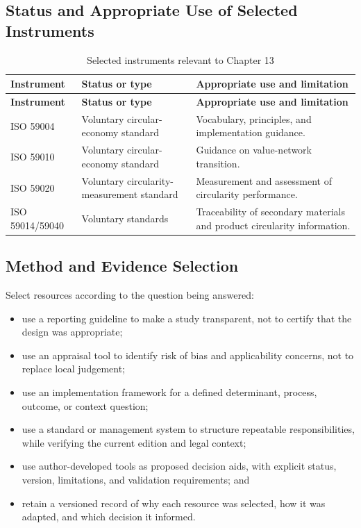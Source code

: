 \subsection{Status and Appropriate Use of Selected Instruments}
\begin{longtable}{@{}p{}p{}p{}@{}}
\caption{Selected instruments relevant to Chapter 13}
\label{tab:comp-ch13-instrument-status}\\
\toprule
\textbf{Instrument} & \textbf{Status or type} & \textbf{Appropriate use and limitation} \\
\midrule
\endfirsthead
\toprule
\textbf{Instrument} & \textbf{Status or type} & \textbf{Appropriate use and limitation} \\
\midrule
\endhead
\bottomrule
\endlastfoot
ISO 59004 & Voluntary circular-economy standard & Vocabulary, principles, and implementation guidance. \\
ISO 59010 & Voluntary circular-economy standard & Guidance on value-network transition. \\
ISO 59020 & Voluntary circularity-measurement standard & Measurement and assessment of circularity performance. \\
ISO 59014/59040 & Voluntary standards & Traceability of secondary materials and product circularity information. \\
\end{longtable}

\subsection{Method and Evidence Selection}
Select resources according to the question being answered:
\begin{itemize}
 \item use a reporting guideline to make a study transparent, not to certify that the design was appropriate;
 \item use an appraisal tool to identify risk of bias and applicability concerns, not to replace local judgement;
 \item use an implementation framework for a defined determinant, process, outcome, or context question;
 \item use a standard or management system to structure repeatable responsibilities, while verifying the current edition and legal context;
 \item use author-developed tools as proposed decision aids, with explicit status, version, limitations, and validation requirements; and
 \item retain a versioned record of why each resource was selected, how it was adapted, and which decision it informed.
\end{itemize}

